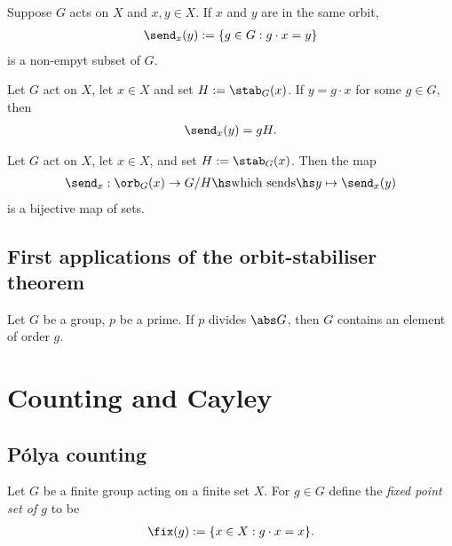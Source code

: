 \documentclass{article}
\begin{document}
\begin{definition}
	Suppose $G$ acts on $X$ and $x,y\in X$. If $x$ and $y$
	are in the same orbit,
	\begin{align*}
		\send_x(y):=\{g\in G : g\cdot x = y\}
	\end{align*}
	is a non-empyt subset of $G$.
\end{definition}

\begin{proposition}
	Let $G$ act on $X$, let $x\in X$ and set $H:=\stab_G(x)$.
	If $y=g\cdot x$ for some $g\in G$, then
	\begin{align*}
		\send_x(y) = gH.
	\end{align*}
\end{proposition}

\begin{theorem}
	Let $G$ act on $X$, let $x\in X$, and set $H:=\stab_G(x)$.
	Then the map
	\begin{align*}
		\send_x:\orb_G(x)\to G/H \hs\text{which sends}\hs y\mapsto \send_x(y)
	\end{align*}
	is a bijective map of sets.
\end{theorem}

\subsection{First applications of the orbit-stabiliser theorem}

\begin{theorem}
	Let $G$ be a group, $p$ be a prime. If $p$ divides $\abs G$,
	then $G$ contains an element of order $g$.
\end{theorem}


\section{Counting and Cayley}

\subsection{P\'olya counting}

\begin{definition}
	Let $G$ be a finite group acting on a finite set $X$. For $g\in G$
	define the \emph{fixed point set of $g$} to be
	\begin{align*}
		\fix(g) := \{x\in X : g\cdot x = x\}.
	\end{align*}
\end{definition}
\end{document}
